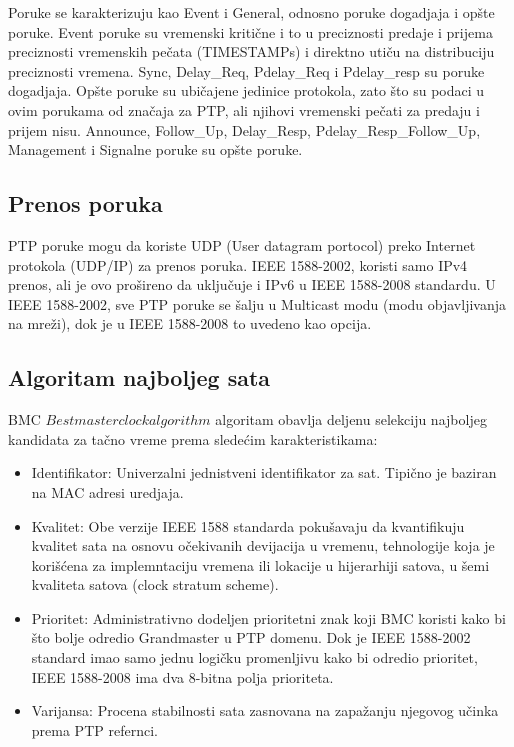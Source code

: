 \documentclass[a4paper,12pt, master]{etf}
\begin{document}
	Poruke se karakterizuju kao Event i General, odnosno poruke dogadjaja i
	op\v{s}te poruke. Event	poruke su vremenski kriti\v{c}ne i to u preciznosti
	predaje i prijema preciznosti vremenskih pe\v{c}ata (TIMESTAMPs) i direktno
	uti\v{c}u na distribuciju preciznosti vremena. Sync, Delay\_Req, Pdelay\_Req
    i Pdelay\_resp su poruke dogadjaja. Op\v{s}te poruke su ubi\v{c}ajene
    jedinice protokola, zato \v{s}to su podaci u ovim porukama od zna\v{c}aja za
    PTP, ali njihovi vremenski pe\v{c}ati za predaju i prijem nisu. Announce,
    Follow\_Up, Delay\_Resp, Pdelay\_Resp\_Follow\_Up, Management i Signalne
    poruke su op\v{s}te poruke.

	\subsection{Prenos poruka}

	PTP poruke mogu da koriste UDP (User datagram portocol) preko Internet
	protokola (UDP/IP) za prenos poruka. IEEE 1588-2002, koristi samo IPv4
	prenos, ali je ovo pro\v{s}ireno da	uklju\v{c}uje i IPv6 u IEEE 1588-2008
	standardu. U IEEE 1588-2002, sve PTP poruke se \v{s}alju u Multicast modu
	(modu objavljivanja na mre\v{z}i), dok je u IEEE 1588-2008 to uvedeno kao
    opcija.

	\subsection{Algoritam najboljeg sata}
	BMC \(Best master clock algorithm\) algoritam obavlja deljenu selekciju
	najboljeg kandidata	za ta\v{c}no vreme prema slede\'{c}im karakteristikama:

	\begin{itemize}
		\item Identifikator: Univerzalni jednistveni identifikator za sat.
		Tipi\v{c}no je baziran na MAC adresi uredjaja.
		\item Kvalitet: Obe verzije IEEE 1588 standarda poku\v{s}avaju da
		kvantifikuju kvalitet sata na osnovu o\v{c}ekivanih devijacija u
		vremenu, tehnologije koja je kori\v{s}\'{c}ena za implemntaciju vremena
		ili lokacije u hijerarhiji satova, u \v{s}emi kvaliteta satova (clock
		stratum scheme).
		\item Prioritet: Administrativno dodeljen prioritetni znak koji BMC
		koristi kako bi \v{s}to bolje odredio Grandmaster u PTP domenu. Dok je
		IEEE 1588-2002 standard imao samo jednu logi\v{c}ku promenljivu kako bi
		odredio prioritet, IEEE 1588-2008 ima dva 8-bitna polja prioriteta.
		\item Varijansa: Procena stabilnosti sata zasnovana na zapa\v{z}anju
		njegovog u\v{c}inka prema PTP refernci.
	\end{itemize}
\end{document}
